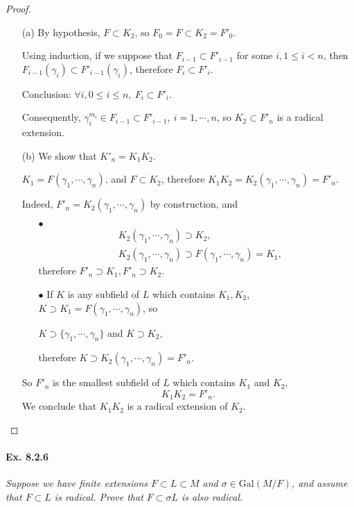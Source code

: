 \documentclass[11pt,a4paper]{article}
\newcommand{\be} {\begin{enumerate}}
\newcommand{\ee} {\end{enumerate}}
\newcommand{\Gal}{\mathrm{Gal}}
\begin{document}
\begin{proof}
\begin{enumerate}
\item[(a)]
By hypothesis, $F\subset K_2$, so $F_0=F \subset K_2 = F'_0$.

Using induction, if we suppose that $F_{i-1} \subset F'_{i-1}$ for some $i, 1\leq i < n$, then $F_{i-1}(\gamma_i) \subset F'_{i-1}(\gamma_i)$,  therefore $F_i \subset F'_i$.

Conclusion: $\forall i, 0 \leq i \leq n, \ F_i \subset F'_i$.

Consequently, $\gamma_i^{m_i} \in F_{i-1} \subset F'_{i-1}, \ i=1,\cdots,n$, so  $K_2 \subset F'_n$ is a radical extension.

\item[(b)]
We show that $K'_n = K_1K_2$.

$K_1 = F(\gamma_1,\cdots,\gamma_n)$, and $F \subset K_2$, therefore $K_1K_2 = K_2(\gamma_1,\cdots,\gamma_n) = F'_n$.

Indeed, $F'_n =  K_2(\gamma_1,\cdots,\gamma_n)$ by construction, and
\be
\item[$\bullet$] 
\begin{align*}
& K_2(\gamma_1,\cdots,\gamma_n) \supset K_2,\\
& K_2(\gamma_1,\cdots,\gamma_n) \supset F(\gamma_1,\cdots,\gamma_n) = K_1,
\end{align*}
therefore $F'_n \supset K_1, F'_n\supset K_2$.

\item[$\bullet$]If $K$ is any subfield of $L$ which contains $K_1,K_2$, $K \supset K_1 =F(\gamma_1,\cdots,\gamma_n)$, so
\begin{center}
 $K \supset \{\gamma_1,\cdots,\gamma_n\}$ and $ K \supset K_2,$
\end{center}
therefore $K \supset  K_2(\gamma_1,\cdots,\gamma_n) = F'_n$.
\ee
So $F'_n$ is the smallest subfield of $L$ which contains $K_1$ and $K_2$,
$$ K_1K_2 = F'_n.$$
We conclude that $K_1K_2$ is a radical extension of $K_2$.

\end{enumerate}
\end{proof}

\paragraph{Ex. 8.2.6}

{\it Suppose we have finite extensions $F \subset L \subset M$ and $\sigma \in \Gal(M/F)$, and assume that $F\subset L$ is radical. Prove that $F \subset\sigma L$ is also radical.
}
\end{document}

